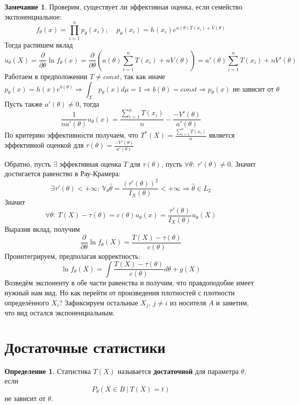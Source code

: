 \documentclass[a4paper,12pt]{article}
\theoremstyle{plain}
\theoremstyle{definition}
\newtheorem{definition}{Определение}[section]
\newtheorem*{note}{Замечание}
\theoremstyle{remark}
\begin{document}
\begin{note}
  Проверим, существует ли эффективная оценка, если семейство экспоненциальное:
  \[
    f_\theta(x) = \prod_{i = 1}^np_\theta(x_i);\;\;\;\; p_\theta(x_i) = h(x_i)e^{a(\theta)T(x_i) + V(\theta)}
  \]
  Тогда распишем вклад
  \[
    u_\theta(X) = \frac{\partial}{\partial\theta}\ln f_\theta(x) = \frac{\partial}{\partial\theta}(a(\theta)\sum_{i = 1}^nT(x_i) + nV(\theta)) = a'(\theta)\sum_{i = 1}^nT(x_i) + nV'(\theta)
  \]
  Работаем в предположении $T \neq const$, так как иначе
  \[
    p_\theta(x) = h(x)e^{b(\theta)} \Rightarrow \int_\mathcal{X}p_\theta(x)d\mu = 1 \Rightarrow b(\theta) = const \Rightarrow p_\theta(x) \text{ не зависит от }\theta
  \]
  Пусть также $a'(\theta) \neq 0$, тогда
  \[
    \frac{1}{na'(\theta)}u_\theta(x) = \frac{\sum_{i = 1}^n T(x_i)}{n} - \frac{-V'(\theta)}{a'(\theta)}
  \]
  По критерию эффективности получаем, что $T^*(X) = \frac{\sum_{i = 1}^n T(x_i)}{n}$ является эффективной оценкой для $\tau(\theta) = \frac{-V'(\theta)}{a'(\theta)}$

  Обратно, пусть $\exists$ эффективная оценка $T$ для $\tau(\theta)$, пусть $\forall \theta:\: \tau'(\theta) \neq 0$. Значит достигается равенство в Рау-Крамера:
  \[
    \exists \tau'(\theta) < +\infty :\: \mathbb{V}_\theta\hat{\theta} = \frac{(\tau'(\theta))^2}{I_X(\theta)} < +\infty \Rightarrow\hat{\theta} \in L_2
  \]
  Значит
  \[
    \forall \theta :\: T(X) - \tau(\theta) = c(\theta)u_\theta(x) = \frac{\tau'(\theta)}{I_X(\theta)}u_\theta(X) 
  \]
  Выразив вклад, получим
  \[
    \frac{\partial}{\partial\theta}\ln f_\theta(X) = \frac{T(X) - \tau(\theta)}{c(\theta)}
  \]
  Проинтегрируем, предполагая корректность:
  \[
    \ln f_\theta(X) = \int\frac{T(X) - \tau(\theta)}{c(\theta)}d\theta + g(X)
  \]
  Возведём экспоненту в обе части равенства и получим, что правдоподобие имеет нужный нам вид. Но как перейти от произведения плотностей с плотности определённого $X_i$? Зафиксируем остальные $X_j,\, j \neq i$ из носителя $A$ и заметим, что вид остался экспоненциальным.
\end{note}

\section{Достаточные статистики}
\begin{definition}
  Статистика $T(X)$ называется \textbf{достаточной} для параметра $\theta$, если 
  \[
    P_\theta(X \in B \:\vert\: T(X) = t)
  \]
  не зависит от $\theta$.
\end{definition}
\end{document}
